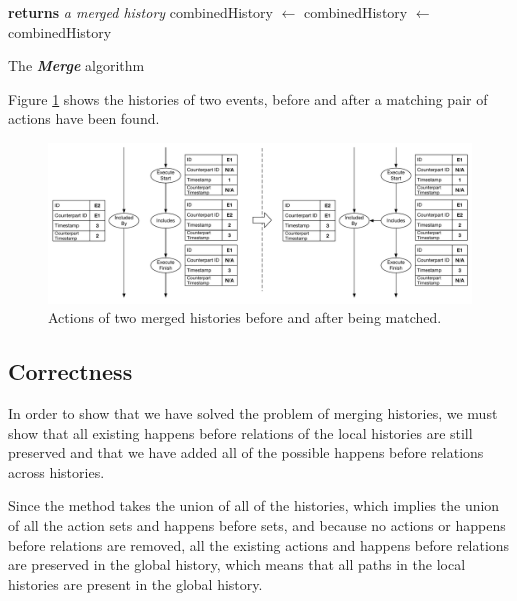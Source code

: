 	\begin{algorithm}
		\begin{algorithmic}
			 \textbf{returns} \textit{a merged history}
			\State combinedHistory $\leftarrow$ 
						\State combinedHistory $\leftarrow$                     	
                    \EndIf
                \EndFor
			\EndIf
			\EndFor
			\State\Return combinedHistory
			\EndFunction
		\end{algorithmic}
		\caption{The \textit{\textbf{Merge}} algorithm}
		\label{alg:merge}
	\end{algorithm}
	
    \noindent Figure \ref{fig:connecting:match-before-after} shows the histories of two events, before and after a matching pair of actions have been found.
    
	\begin{figure}[H]
		\centering
		\includegraphics[width=\textwidth]{4connect/images/match-before-after.pdf}
		\caption{Actions of two merged histories before and after being matched.}
		\label{fig:connecting:match-before-after}
	\end{figure}
	
    \subsection{Correctness}
    In order to show that we have solved the problem of merging histories, we must show that all existing happens before relations of the local histories are still preserved and that we have added all of the possible happens before relations across histories.
    
    \newpar Since the method takes the union of all of the histories, which implies the union of all the action sets and happens before sets, and because no actions or happens before relations are removed, all the existing actions and happens before relations are preserved in the global history, which means that all paths in the local histories are present in the global history.
    

